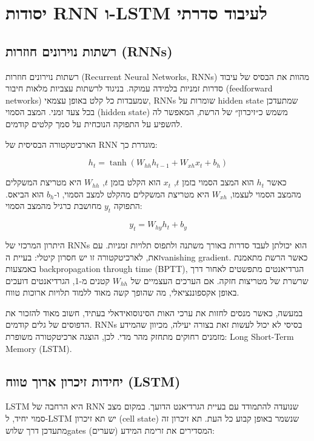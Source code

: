 \chapter{יסודות RNN ו-LSTM לעיבוד סדרתי}

\section{רשתות נוירונים חוזרות (RNNs)}

רשתות נוירונים חוזרות (Recurrent Neural Networks, RNNs) מהוות את הבסיס של עיבוד סדרות זמניות בלמידה עמוקה. בניגוד לרשתות עצביות מלאות חיבור (feedforward networks) שמעבדות כל קלט באופן עצמאי, RNNs שומרות על \textenglish{hidden state} שמתעדכן בכל צעד זמני. המצב הסמוי (hidden state) משמש כ״זיכרון״ של הרשת, המאפשר לה להשפיע על התפוקה הנוכחית על סמך קלטים קודמים.

הארכיטקטורה הבסיסית של RNN מוגדרת כך:

\begin{equation}
h_t = \tanh(W_{hh} h_{t-1} + W_{xh} x_t + b_h)
\end{equation}

כאשר $h_t$ הוא המצב הסמוי בזמן $t$, $x_t$ הוא הקלט בזמן $t$, $W_{hh}$ היא מטריצת המשקלים מהמצב הסמוי לעצמו, $W_{xh}$ היא מטריצת המשקלים מהקלט למצב הסמוי, ו-$b_h$ הוא הביאס. התפוקה $y_t$ מחושבת כרגיל מהמצב הסמוי:

\begin{equation}
y_t = W_{hy} h_t + b_y
\end{equation}

היתרון המרכזי של RNNs הוא יכולתן לעבד סדרות באורך משתנה ולתפוס תלויות זמניות. עם זאת, לארכיטקטורה זו יש חסרון קיטלי: בעיית ה\textenglish{vanishing gradient}. כאשר הרשת מתאמנת באמצעות \textenglish{backpropagation through time (BPTT)}, הגרדיאנטים מתפשטים לאחור דרך שרשרת של מטריצות חזקה. אם הערכים העצמיים של $W_{hh}$ קטנים מ-1, הגרדיאנטים דועכים באופן אקספוננציאלי, מה שהופך קשה מאוד ללמוד תלויות ארוכות טווח.

במעשה, כאשר מנסים לחזות את ערכי האות הסינוסואידאלי בעתיד, חשוב מאוד להזכור את הדפוסים של גלים קודמים. RNNs בסיסי לא יכול לעשות זאת בצורה יעילה, מכיוון שהמידע מזמנים רחוקים מתחזק מהר מדי. לכן, הוצגה ארכיטקטורה משופרת: \textenglish{Long Short-Term Memory (LSTM)}.

\section{יחידות זיכרון ארוך טווח (LSTM)}

\textenglish{LSTM} היא הרחבה של RNN שנועדה להתמודד עם בעיית הגרדיאנט הדועך. במקום מצב סמוי יחיד, ל-LSTM יש תא זיכרון (\textenglish{cell state}) שנשמר באופן קבוע כל העת. תא זיכרון זה מתעדכן דרך שלוש\textenglish{gates} (שערים) המסדירים את זרימת המידע:

